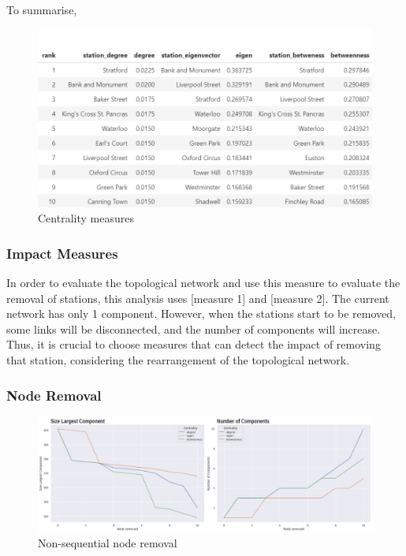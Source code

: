 \documentclass[10pt]{report}
\numberwithin{figure}{section}
\numberwithin{table}{section}
\begin{document}
    To summarise,     

    \begin{figure}[htp]
        \centering
        \includegraphics[width=14cm]{Image/Table_CentralitiesMeasures.png}
        \caption{Centrality measures}
        \label{fig:galaxy}
    \end{figure}

\newpage    

\subsubsection{Impact Measures} 

In order to evaluate the topological network and use this measure to evaluate the removal of stations, this analysis uses [measure 1] and [measure 2]. The current network has only 1 component. However, when the stations start to be removed, some links will be disconnected, and the number of components will increase. Thus, it is crucial to choose measures that can detect the impact of removing that station, considering the rearrangement of the topological network. 

\subsubsection{Node Removal} 

    \begin{figure}[htp]
        \centering
        \includegraphics[width=16cm]{Image/Part1_nonsequential_Summarise.png}
        \caption{Non-sequential node removal}
        \label{fig:galaxy}
    \end{figure}
\end{document}
